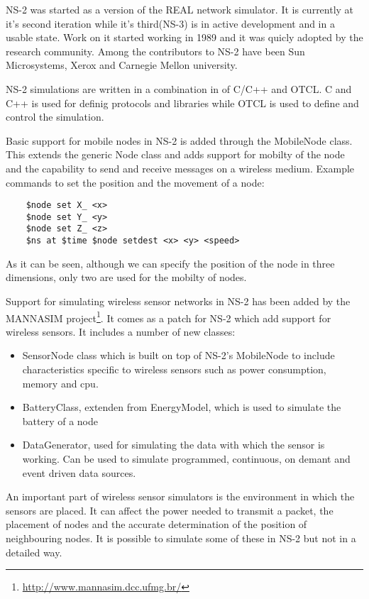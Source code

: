 \label{subsec:ns2}

NS-2 was started as a version of the REAL network simulator. It is currently at it's 
second iteration while it's third(NS-3) is in active development and in a usable state.
Work on it started working in 1989 and it was quicly adopted by the research community.
Among the contributors to NS-2 have been Sun Microsystems, Xerox and Carnegie Mellon 
university. 

NS-2 simulations are written in a combination in of C/C++ and OTCL. C and C++ is 
used for definig protocols and libraries while OTCL is used to define and control
the simulation.

Basic support for mobile nodes in NS-2 is added through the MobileNode class. This extends
the generic Node class and adds support for mobilty of the node and the capability to
send and receive messages on a wireless medium. 
Example commands to set the position and the movement of a node:
\lstset{numbers=none}
\begin{lstlisting}
	$node set X_ <x>
	$node set Y_ <y>
	$node set Z_ <z>
	$ns at $time $node setdest <x> <y> <speed>
\end{lstlisting}
As it can be seen, although we can specify the position of the node in three dimensions,
only two are used for the mobilty of nodes.

Support for simulating wireless sensor networks in NS-2 has been added by the 
MANNASIM project\footnote{\url{http://www.mannasim.dcc.ufmg.br/}}. It comes as
a patch for NS-2 which add support for wireless sensors. It includes a number of
new classes:
\begin{itemize}
	\item SensorNode class which is built on top of NS-2's MobileNode 
to include characteristics specific to wireless sensors such as power 
consumption, memory and cpu.
	\item BatteryClass, extenden from EnergyModel, which is used to simulate
the battery of a node
	\item DataGenerator, used for simulating the data with which the sensor is
working. Can be used to simulate programmed, continuous, on demant and event driven
data sources.
\end{itemize}

An important part of wireless sensor simulators is the environment in which the sensors
are placed. It can affect the power needed to transmit a packet, the placement of nodes
and the accurate determination of the position of neighbouring nodes. It is possible to
simulate some of these in NS-2 but not in a detailed way.
